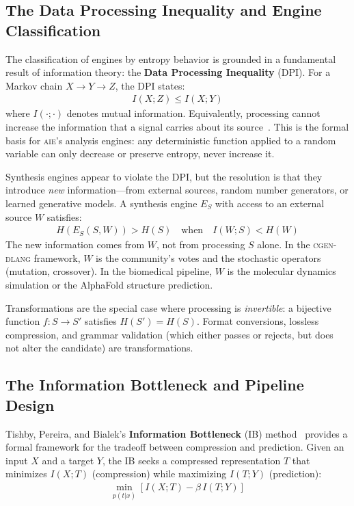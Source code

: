 \documentclass[11pt,letterpaper]{article}
\newcommand{\keyword}[1]{\textbf{\textcolor{accentpurple}{#1}}}
\newcommand{\aie}{\textsc{aie}}
\newcommand{\cgen}{\textsc{cgen-dlang}}
\begin{document}
\subsection{The Data Processing Inequality and Engine Classification}

The classification of engines by entropy behavior is grounded in a fundamental result of information theory: the \keyword{Data Processing Inequality} (DPI). For a Markov chain $X \rightarrow Y \rightarrow Z$, the DPI states:
\begin{align}
    I(X; Z) \leq I(X; Y)
\end{align}
where $I(\cdot;\cdot)$ denotes mutual information. Equivalently, processing cannot increase the information that a signal carries about its source~\cite{cover2006}. This is the formal basis for \aie{}'s analysis engines: any deterministic function applied to a random variable can only decrease or preserve entropy, never increase it.

Synthesis engines appear to violate the DPI, but the resolution is that they introduce \textit{new} information---from external sources, random number generators, or learned generative models. A synthesis engine $E_S$ with access to an external source $W$ satisfies:
\begin{align}
    H(E_S(S, W)) > H(S) \quad \text{when} \quad I(W; S) < H(W)
\end{align}
The new information comes from $W$, not from processing $S$ alone. In the \cgen{} framework, $W$ is the community's votes and the stochastic operators (mutation, crossover). In the biomedical pipeline, $W$ is the molecular dynamics simulation or the AlphaFold structure prediction.

Transformations are the special case where processing is \textit{invertible}: a bijective function $f: S \rightarrow S'$ satisfies $H(S') = H(S)$. Format conversions, lossless compression, and grammar validation (which either passes or rejects, but does not alter the candidate) are transformations.

\subsection{The Information Bottleneck and Pipeline Design}

Tishby, Pereira, and Bialek's \keyword{Information Bottleneck} (IB) method~\cite{tishby2000} provides a formal framework for the tradeoff between compression and prediction. Given an input $X$ and a target $Y$, the IB seeks a compressed representation $T$ that minimizes $I(X; T)$ (compression) while maximizing $I(T; Y)$ (prediction):
\begin{align}
    \min_{p(t|x)} \left[ I(X; T) - \beta \, I(T; Y) \right]
\end{align}
\end{document}
